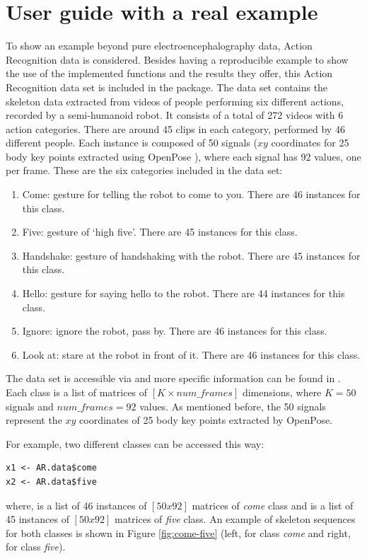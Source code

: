 \section{User guide with a real example}
 To show an example beyond pure electroencephalography data,  Action Recognition data is considered. Besides having a reproducible example to show the use of the implemented functions and the results they offer, this Action Recognition data set is included in the package. The data set contains the skeleton data extracted from videos of people performing six different actions, recorded by a semi-humanoid robot. It consists of a total of 272 videos with 6 action categories. There are around 45 clips in each category, performed by 46 different people. Each instance is composed of 50 signals ($xy$ coordinates for 25 body key points extracted using OpenPose \citep{cao2019openpose}), where each signal has 92 values, one per frame. These are the six categories included in the data set:
\begin{enumerate}
    \item Come: gesture for telling the robot to come to you. There are 46 instances for this class.
    \item Five: gesture of `high five'. There are 45 instances for this class.
    \item Handshake: gesture of handshaking with the robot. There are 45 instances for this class.
    \item Hello: gesture for saying hello to the robot. There are 44 instances for this class.
    \item Ignore: ignore the robot, pass by. There are 46 instances for this class.
    \item Look at: stare at the robot in front of it. There are 46 instances for this class.
\end{enumerate}
The data set is accessible via  and more specific information can be found in \citep{rodriguez2020shedding}. Each class is a list of matrices of $[K \times num\_frames]$ dimensions, where $K=50$ signals and $num\_frames=92$ values. As mentioned before, the 50 signals represent the $xy$ coordinates of 25 body key points extracted by OpenPose. 

For example, two different classes can be accessed this way:
\begin{verbatim}
x1 <- AR.data$come
x2 <- AR.data$five
\end{verbatim}
where,  is a list of 46 instances of $[50x92]$ matrices of \textit{come} class and  is a list of 45 instances of $[50x92]$ matrices of \textit{five} class. An example of skeleton sequences for both classes is shown in Figure \ref{fig:come-five} (left, for class \textit{come} and right, for class \textit{five}).

